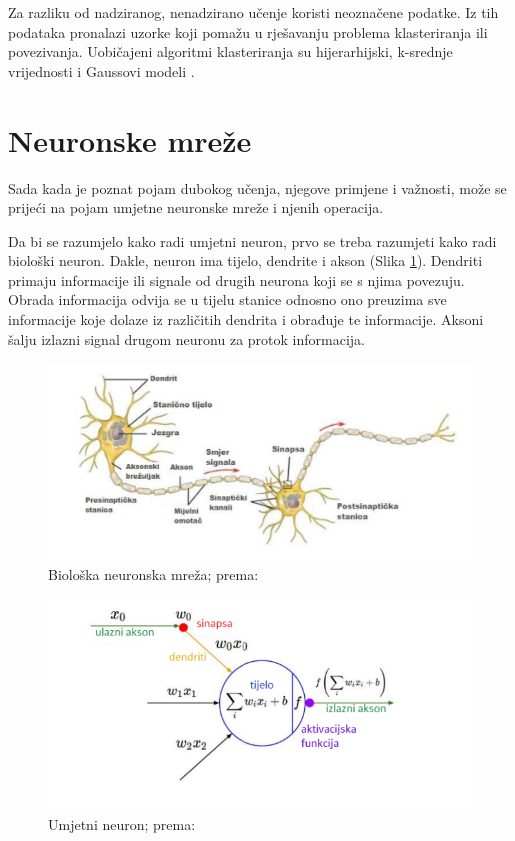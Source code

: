 \documentclass[]{foi} %
\begin{document}
Za razliku od nadziranog, nenadzirano učenje \cite{tds1, deep} koristi neoznačene podatke. Iz tih podataka pronalazi uzorke koji pomažu u rješavanju problema klasteriranja ili povezivanja. Uobičajeni algoritmi klasteriranja su hijerarhijski, k-srednje vrijednosti i Gaussovi modeli \cite[str. 142]{deep}.

\newpage
\section{Neuronske mreže}

Sada kada je poznat pojam dubokog učenja, njegove primjene i važnosti, može se prijeći na pojam umjetne neuronske mreže i njenih operacija.

Da bi se razumjelo kako radi umjetni neuron, prvo se treba razumjeti kako radi biološki neuron.
Dakle, neuron ima tijelo, dendrite i akson \cite{tds1} (Slika \ref{fig:bnn}). Dendriti primaju informacije ili signale od drugih neurona koji se s njima povezuju. Obrada informacija odvija se u tijelu stanice odnosno ono preuzima sve informacije koje dolaze iz različitih dendrita i obrađuje te informacije. Aksoni šalju izlazni signal drugom neuronu za protok informacija.

\begin{figure}[!ht]
    \centering
    \includegraphics[width=1\textwidth]{slike/bnn.png}
    \caption{Biološka neuronska mreža; prema: \cite{builtin1}}
    \label{fig:bnn}
\end{figure}

\begin{figure}[!ht]
    \centering
    \includegraphics[width=1\textwidth]{slike/neuron.png}
    \caption{Umjetni neuron; prema: \cite{principles}}
    \label{fig:neuron}
\end{figure}
\end{document}
